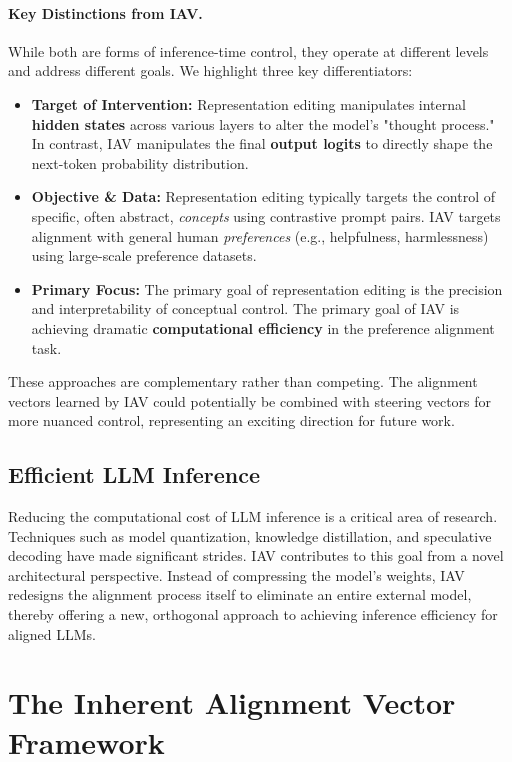 \documentclass{article} %
\begin{document}
\paragraph{Key Distinctions from IAV.} While both are forms of inference-time control, they operate at different levels and address different goals. We highlight three key differentiators:
\begin{itemize}
\item \textbf{Target of Intervention:} Representation editing manipulates internal \textbf{hidden states} across various layers to alter the model's "thought process." In contrast, IAV manipulates the final \textbf{output logits} to directly shape the next-token probability distribution.
\item \textbf{Objective \& Data:} Representation editing typically targets the control of specific, often abstract, \textit{concepts} using contrastive prompt pairs. IAV targets alignment with general human \textit{preferences} (e.g., helpfulness, harmlessness) using large-scale preference datasets.
\item \textbf{Primary Focus:} The primary goal of representation editing is the precision and interpretability of conceptual control. The primary goal of IAV is achieving dramatic \textbf{computational efficiency} in the preference alignment task.
\end{itemize}
These approaches are complementary rather than competing. The alignment vectors learned by IAV could potentially be combined with steering vectors for more nuanced control, representing an exciting direction for future work.

\subsection{Efficient LLM Inference}
Reducing the computational cost of LLM inference is a critical area of research. Techniques such as model quantization, knowledge distillation, and speculative decoding \citep{leviathan2023fast} have made significant strides. IAV contributes to this goal from a novel architectural perspective. Instead of compressing the model's weights, IAV redesigns the alignment process itself to eliminate an entire external model, thereby offering a new, orthogonal approach to achieving inference efficiency for aligned LLMs.
\section{The Inherent Alignment Vector Framework}
\end{document}
